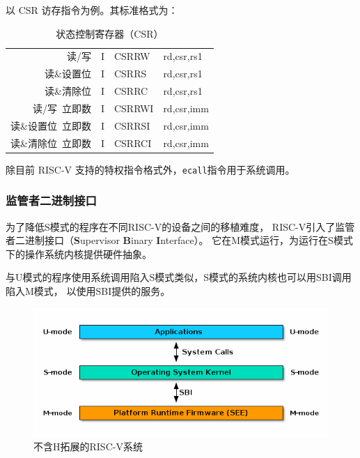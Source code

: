 \documentclass{../runikraft-report}
\begin{document}
以 CSR 访存指令为例。其标准格式为：
\begin{table}[H]
    \centering
    \caption{状态控制寄存器（CSR）}
    \begin{tabular}{|r|c|>{\ttfamily}l>{\ttfamily}l|}
        \hline
        读/写&I&CSRRW&rd,csr,rs1\\
        读\&设置位&I&CSRRS&rd,csr,rs1\\
        读\&清除位&I&CSRRC&rd,csr,rs1\\
        读/写\ 立即数&I&CSRRWI&rd,csr,imm\\
        读\&设置位\ 立即数&I&CSRRSI&rd,csr,imm\\
        读\&清除位\ 立即数&I&CSRRCI&rd,csr,imm\\\hline
    \end{tabular}
\end{table}

除目前 RISC-V 支持的特权指令格式外，\texttt{ecall}指令用于系统调用。

\subsubsection{监管者二进制接口}
为了降低S模式的程序在不同RISC-V的设备之间的移植难度，
RISC-V引入了监管者二进制接口（\textbf{S}upervisor \textbf{B}inary \textbf{I}nterface）。
它在M模式运行，为运行在S模式下的操作系统内核提供硬件抽象。

与U模式的程序使用系统调用陷入S模式类似，S模式的系统内核也可以用SBI调用陷入M模式，
以使用SBI提供的服务。

\begin{figure}[tbh!]
\centering
\includegraphics[width=0.7\linewidth]{assets/riscv-sbi-intro1.png}
\caption{不含H拓展的RISC-V系统}
\label{fig:riscv-sbi}
\end{figure}
\end{document}
